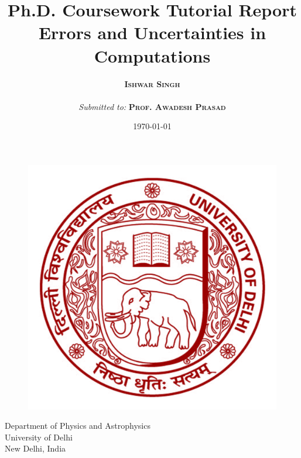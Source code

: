 \documentclass[a4,12pt]{article}
\numberwithin{equation}{subsection}
\begin{document}
\begin{titlepage}
    \begin{center}
        \title{\textbf{Ph.D. Coursework Tutorial Report} \\ Errors and Uncertainties in Computations}
        \vspace{1.5cm}
		\author{\textsc{\textbf{Ishwar Singh}}\\ \\ \textit{ Submitted to:} \textsc{\textbf{Prof. Awadesh Prasad}}}
		\vspace{0.7cm}
		\date{\today}
		\maketitle
		\thispagestyle{empty}
				\begin{figure}[H]
				\begin{center}
        \includegraphics[scale=0.4]{University_of_delhi_logo.png}
				\end{center}
				\end{figure}
       	\vspace{0.8cm}
       	\begin{center}
        Department of Physics and Astrophysics\\
        University of Delhi\\
        New Delhi, India\\
				\end{center}


    \end{center}
\end{titlepage}
\printnomenclature[3em]
\tableofcontents
\thispagestyle{empty}
\listoffigures
\thispagestyle{empty}
\newpage
\clearpage
\pagebreak
\setcounter{page}{1}
\end{document}
